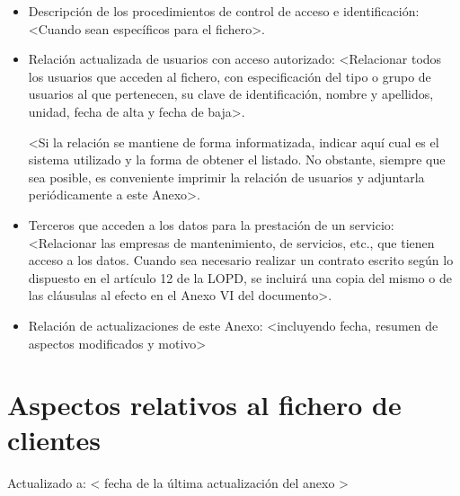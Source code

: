 \documentclass[a4paper,11pt,bibtotoc,noliststotoc]{scrbook}
\begin{document}
\begin{itemize}
\item Descripción de los procedimientos de control de acceso e identificación: <Cuando sean específicos para el fichero>.

\item Relación actualizada de usuarios con acceso autorizado: <Relacionar todos los usuarios que acceden al fichero, con especificación del tipo o grupo de usuarios al que pertenecen, su clave de identificación, nombre y apellidos, unidad, fecha de alta y fecha de baja>.

<Si la relación se mantiene de forma informatizada, indicar aquí cual es el sistema utilizado y la forma de obtener el listado. No obstante, siempre que sea posible, es conveniente imprimir la relación de usuarios y adjuntarla periódicamente a este Anexo>.

\item Terceros que acceden a los datos para la prestación de un servicio: <Relacionar las empresas de mantenimiento, de servicios, etc., que tienen acceso a los datos. Cuando sea necesario realizar un contrato escrito según lo dispuesto en el artículo 12 de la LOPD, se incluirá una copia del mismo o de las cláusulas al efecto en el Anexo VI del documento>.

\item Relación de actualizaciones de este Anexo: <incluyendo fecha, resumen de aspectos modificados y motivo>

\end{itemize}






\section{Aspectos relativos al fichero de clientes}


Actualizado a: < fecha de la última actualización del anexo >
\end{document}
